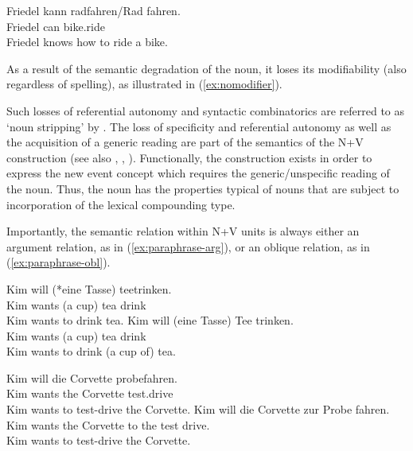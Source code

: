 \documentclass[biblatex, charis, linguex]{glossa}\usepackage{knitr}
\begin{document}
\begin{exe}
  \ex\gll Friedel kann {radfahren\slash Rad fahren.}\\
  Friedel can bike.ride\\
  \trans Friedel knows how to ride a bike. \label{ex:noreference}
\end{exe}

As a result of the semantic degradation of the noun, it loses its modifiability (also regardless of spelling), as illustrated in (\ref{ex:nomodifier}).

\begin{exe}
\end{exe}

Such losses of referential autonomy and syntactic combinatorics are referred to as `noun stripping' by \citet[287]{Gallmann1999}.
The loss of specificity and referential autonomy as well as the acquisition of a generic reading are part of the semantics of the N+V construction (see also \citealt[287]{Gallmann1999}, \citealt[108]{BredelGuenther2000}, \citealt[354]{Eisenberg2020a}).
Functionally, the construction exists in order to express the new event concept which requires the generic\slash unspecific reading of the noun.
Thus, the noun has the properties typical of nouns that are subject to incorporation of the lexical compounding type.

Importantly, the semantic relation within N+V units is always either an argument relation, as in (\ref{ex:paraphrase-arg}), or an oblique relation, as in (\ref{ex:paraphrase-obl}).

\begin{exe}
  \ex\label{ex:paraphrase-arg}
  \begin{xlist}
    \ex\gll Kim will {(*eine} {Tasse)} teetrinken.\\
    Kim wants {(a} {cup)} {tea drink}\\
    \trans Kim wants to drink tea.
    \ex\gll Kim will (eine Tasse) Tee trinken.\\
    Kim wants {(a} {cup)} tea drink\\
    \trans Kim wants to drink (a cup of) tea.
  \end{xlist}
  \ex\label{ex:paraphrase-obl}
  \begin{xlist}
    \ex\gll Kim will die Corvette probefahren.\\
    Kim wants the Corvette test.drive\\
    \trans Kim wants to test-drive the Corvette.
    \ex\gll Kim will die Corvette zur Probe fahren.\\
    Kim wants the Corvette {to the} test drive.\\
    \trans Kim wants to test-drive the Corvette.
  \end{xlist}
\end{exe}
\end{document}
